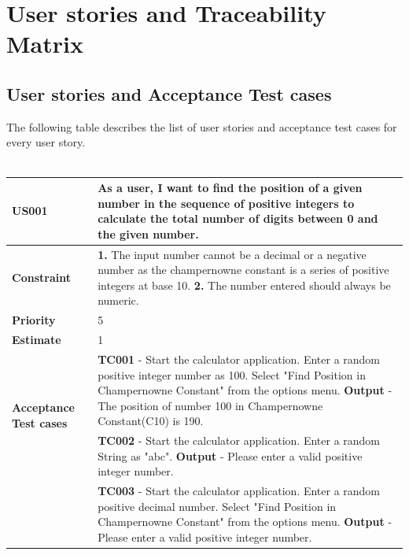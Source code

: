 \documentclass[12pt, a4paper]{report}
\begin{document}
\chapter{User stories and Traceability Matrix}
\section{User stories and Acceptance Test cases}
The following table describes the list of user stories and acceptance test cases for every user story.
\\\\
\begin{tabular}{|p{3cm}|p{12cm}|}
\hline
     \textbf{US001} &  As a user, I want to find the position of a given number in the sequence of positive integers to calculate the total number of digits between 0 and the given number.\\\hline
     \textbf{Constraint} &  \textbf{1. } The input number cannot be a decimal or a negative number as the champernowne constant is a series of positive integers at base 10. \newline \textbf{2. } The number entered should always be numeric.\\\hline
     \textbf{Priority} & 5 \\\hline
     \textbf{Estimate} & 1 \\\hline
     \multirow{2}{3cm}{\textbf{Acceptance Test cases}} & \textbf{TC001} - Start the calculator application. Enter a random positive integer number as 100. Select "Find Position in Champernowne Constant" from the options menu. \newline \textbf{Output} - The position of number 100 in Champernowne Constant(C10) is 190.\\\cline{2-2}
     & \textbf{TC002} - Start the calculator application. Enter a random String as "abc". \newline \textbf{Output} - Please enter a valid positive integer number.\\\cline{2-2}
     & \textbf{TC003} - Start the calculator application. Enter a random positive decimal number. Select "Find Position in Champernowne Constant" from the options menu. \newline \textbf{Output} - Please enter a valid positive integer number.\\\hline
\end{tabular}
\\\\\\
\end{document}
